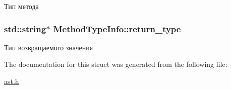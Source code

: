 Тип метода 

\hypertarget{structMethodTypeInfo_a4bd6ddafdf47413038f62af796fe816a}{}
\subsubsection[{return\+\_\+type}]{\setlength{\rightskip}{0pt plus 5cm}std\+::string$\ast$ Method\+Type\+Info\+::return\+\_\+type}\label{structMethodTypeInfo_a4bd6ddafdf47413038f62af796fe816a}


Тип возвращаемого значения 



The documentation for this struct was generated from the following file\+:\begin{DoxyCompactItemize}
\item 
\hyperlink{ast_8h}{ast.\+h}\end{DoxyCompactItemize}
